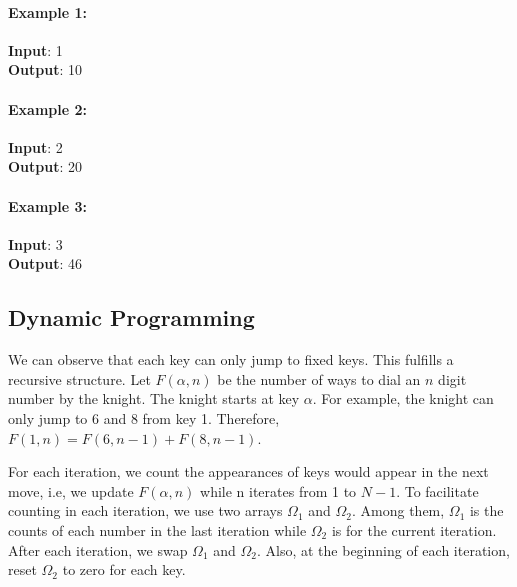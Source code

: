 \documentclass[a4paper,12pt]{article}
\begin{document}
\paragraph{Example 1:}
\begin{flushleft}
\textbf{Input}: 1
\\
\textbf{Output}: 10
\end{flushleft}
\paragraph{Example 2:}
\begin{flushleft}
 \textbf{Input}: 2
 \\
 \textbf{Output}: 20
 \end{flushleft} 
\paragraph{Example 3:}
\begin{flushleft}
\textbf{Input}: 3
\\
\textbf{Output}: 46
\end{flushleft}
\subsection{Dynamic Programming}
\begin{figure}[H]
\end{figure}
We can observe that each key can only jump to fixed keys. This fulfills a recursive structure. Let $F(\alpha, n)$ be the number of ways to dial an $n$ digit number by the knight. The knight starts at key $\alpha$. For example, the knight can only jump to 6 and 8 from key 1. Therefore, $F(1, n) = F(6, n-1) + F(8, n-1)$.
\par
For each iteration, we count the appearances of keys would appear in the next move, i.e, we update $F(\alpha, n)$ while n iterates from 1 to $N-1$. To facilitate counting in each iteration, we use two arrays $\Omega_1$ and $\Omega_2$. Among them, $\Omega_1$ is the counts of each number in the last iteration while $\Omega_2$ is for the current iteration. After each iteration, we swap $\Omega_1$ and $\Omega_2$. Also, at the beginning of each iteration, reset $\Omega_2$ to zero for each key.
\end{document}
